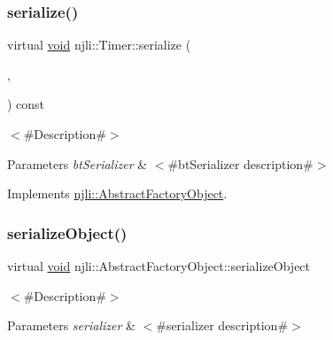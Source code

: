 \mbox{\label{classnjli_1_1_timer_a12146561a9d2406251a2f6cda1833bb7}} 
\subsubsection{\texorpdfstring{serialize()}{serialize()}}
{\footnotesize\ttfamily virtual \mbox{\hyperlink{_thread_8h_af1e856da2e658414cb2456cb6f7ebc66}{void}} njli\+::\+Timer\+::serialize (\begin{DoxyParamCaption}\item[{\mbox{\hyperlink{_thread_8h_af1e856da2e658414cb2456cb6f7ebc66}{void}} $\ast$}]{,  }\item[{bt\+Serializer $\ast$}]{ }\end{DoxyParamCaption}) const\hspace{0.3cm}{\ttfamily [virtual]}}

$<$\#\+Description\#$>$


\begin{DoxyParams}{Parameters}
{\em bt\+Serializer} & $<$\#bt\+Serializer description\#$>$ \\
\hline
\end{DoxyParams}


Implements \mbox{\hyperlink{classnjli_1_1_abstract_factory_object_aad2fbe86fb3bdecf02918a96b9c57976}{njli\+::\+Abstract\+Factory\+Object}}.

\mbox{\label{classnjli_1_1_timer_a4fc4bcd9d1930911474210c047372fc0}} 
\subsubsection{\texorpdfstring{serialize\+Object()}{serializeObject()}}
{\footnotesize\ttfamily virtual \mbox{\hyperlink{_thread_8h_af1e856da2e658414cb2456cb6f7ebc66}{void}} njli\+::\+Abstract\+Factory\+Object\+::serialize\+Object}

$<$\#\+Description\#$>$


\begin{DoxyParams}{Parameters}
{\em serializer} & $<$\#serializer description\#$>$ \\
\hline
\end{DoxyParams}
\mbox{\label{classnjli_1_1_timer_a087eb5f8d9f51cc476f12f1d10a3cb95}} 
